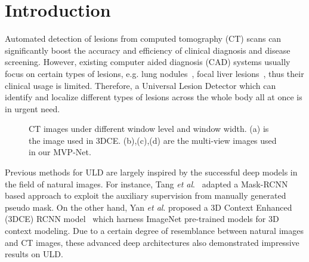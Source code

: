 \documentclass[runningheads]{llncs}
\begin{document}
\section{Introduction}\label{intro}

Automated detection of lesions from computed tomography (CT) scans can significantly boost the accuracy and efficiency of clinical diagnosis and disease screening. However, existing computer aided diagnosis (CAD) systems usually focus on certain types of lesions, e.g. lung nodules~\cite{APND}, focal liver lesions~\cite{Liver}, thus their clinical usage is limited. Therefore, a Universal Lesion Detector which can identify and localize different types of lesions across the whole body all at once is in urgent need. 



\begin{figure}[htbp]
\centering
{}
\centering
\caption{CT images under different window level and window width. (a) is the image used in 3DCE. (b),(c),(d) are the multi-view images used in our MVP-Net. } \label{fig1}
\end{figure}

Previous methods for ULD are largely inspired by the successful deep models in the field of natural images. For instance, Tang \textit{et al}.~\cite{ULDOR} adapted a Mask-RCNN~\cite{MRCNN} based approach to exploit the auxiliary supervision from manually generated pseudo mask. On the other hand, Yan \textit{et al}. proposed a 3D Context Enhanced (3DCE) RCNN model~\cite{3DCE} which harness ImageNet pre-trained models for 3D context modeling. Due to a certain degree of resemblance between natural images and CT images, these advanced deep architectures also demonstrated impressive results on ULD.
\end{document}
